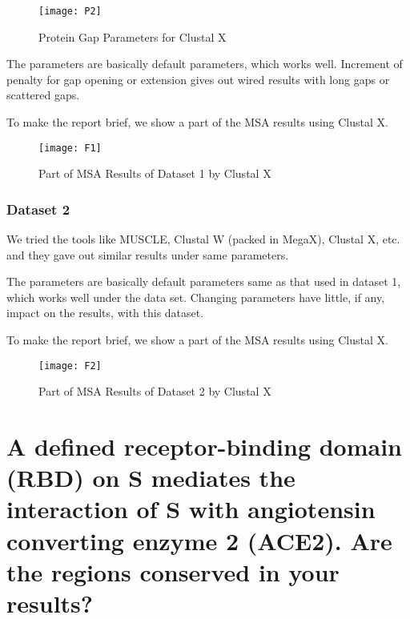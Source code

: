 \documentclass[en,black,12pt,normal]{elegantnote}
\newcommand{\upcite}[1]{\textsuperscript{\textsuperscript{\cite{#1}}}}
\begin{document}
\begin{figure}[H]
    \centering
    \texttt{[image: P2]}
    \caption{Protein Gap Parameters for Clustal X}
    \label{P-02}
\end{figure}


The parameters are basically default parameters, which works well. Increment of penalty for gap opening or extension gives out wired results with long gaps or scattered gaps.

To make the report brief, we show a part of the MSA results using Clustal X.

\begin{figure}[H]
    \centering
    \texttt{[image: F1]}
    \caption{Part of MSA Results of Dataset 1 by Clustal X}
    \label{F-01}
\end{figure}

\subsubsection{Dataset 2}

We tried the tools like MUSCLE\upcite{edgar2004muscle}, Clustal W\upcite{larkin2007clustal} (packed in MegaX\upcite{kumar2018mega}), Clustal X\upcite{larkin2007clustal}, etc. and they gave out similar results under same parameters. 

The parameters are basically default parameters same as that used in dataset 1, which works well under the data set. Changing parameters have little, if any, impact on the results, with this dataset.

To make the report brief, we show a part of the MSA results using Clustal X.

\begin{figure}[H]
    \centering
    \texttt{[image: F2]}
    \caption{Part of MSA Results of Dataset 2 by Clustal X}
    \label{F-02}
\end{figure}


















\section{A defined receptor-binding domain (RBD) on S mediates the interaction of S with angiotensin converting enzyme 2 (ACE2). Are the regions conserved in your results?}
\end{document}
